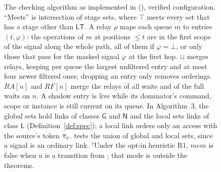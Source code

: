 \begin{figure}[tp]
\begin{minipage}[t]{0.49\textwidth}
\begin{tabbing}
\end{tabbing}
\end{minipage}
\caption{The checking algorithm as implemented in \sys (), verified configuration. ``Meets''
is intersection of stage sets, where $\top$ meets every set that has a stage other than $\mathsf{LT}$. A relay $\rho$
maps each queue $m$ to entries $(t, \varphi)$: the operations of $m$ at positions $\le t$ are in the first scope of
the signal along the whole path, all of them if $\varphi = \bot$, or only those that pass  for the
masked signal $\varphi$ at the first hop. $\sqcup$ merges relays, keeping per queue the largest unfiltered entry and
at most four newer filtered ones; dropping an entry only removes orderings. $\mathit{RA}[n]$ and $\mathit{RF}[n]$
merge the relays of all waits and of the full waits on $n$. A shadow entry is live while its dominator's command,
scope or instance is still current on its queue. In Algorithm~3, the global sets hold links of classes $\mathsf{G}$
and $\mathsf{N}$ and the local sets links of class $\mathsf{L}$ (Definition~\ref{def:spec}); a local link orders only
an access with the source's token $\pi_e$.  tests the union of global and local sets, since a signal
is an ordinary link. $^\dagger$Under the opt-in heuristic R1, $\mathit{mem}$ is false when $u$ is a transition from
; that mode is outside the theorems.}
\label{fig:alg}
\end{figure}

